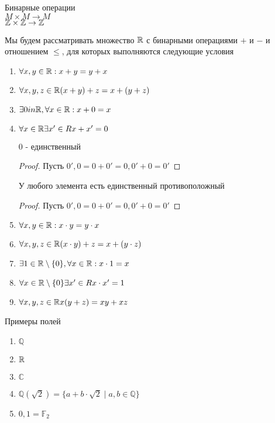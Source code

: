 

\begin{definition}
Бинарные операции \\
$ M \times M \rightarrow M $ \\
$ \mathbb{Z} \times \mathbb{Z} \rightarrow \mathbb{Z} $ 
\end{definition}

Мы будем рассматривать множество $\mathbb{R}$ с бинарными операциями $+$ и $-$ и отношением $\leq$, для которых выполняются следующие условия
\begin{enumerate}
	\item $ \forall x, y \in \mathbb{R} : x + y = y + x $ 
	\item $ \forall x, y, z \in \mathbb{R} (x + y) + z = x + (y + z) $ 
	\item $ \exists 0 in \mathbb{R}, \forall x \in \mathbb{R}: x+0 = x $ 
	\item $ \forall x \in \mathbb{R} \exists x' \in R x + x' = 0 $ 
	\begin{lemma}
		0 - единственный 
		\begin{proof}
			Пусть $0' , 0 = 0 + 0' = 0, 0' + 0 = 0'$
		\end{proof} 
	\end{lemma}
	\begin{lemma}
	У любого элемента есть единственный противоположный
	\begin{proof}
		Пусть $0' , 0 = 0 + 0' = 0, 0' + 0 = 0'$
	\end{proof} 
\end{lemma}
	\item $ \forall x, y \in \mathbb{R} : x \cdot y = y \cdot x $ 
    \item $ \forall x, y, z \in \mathbb{R} (x \cdot y) + z = x + (y \cdot z) $ 
	\item $ \exists 1 \in \mathbb{R} \setminus \{0\}, \forall x \in \mathbb{R}: x \cdot 1 = x $ 
	\item  $ \forall x \in \mathbb{R} \setminus \{0\} \exists x' \in R x \cdot x' = 1 $
	\item $ \forall x, y, z \in \mathbb{R} x(y+z) = xy + xz $ 
\end{enumerate}

\begin{example}
	Примеры полей
	\begin{enumerate}
		\item $\mathbb{Q}$ 
		\item  $\mathbb{R}$ 
		\item  $\mathbb{C}$ 
		\item  $\mathbb{Q}(\sqrt{2}) = \{a + b \cdot \sqrt{2} \mid a, b \in \mathbb{Q} \}$ 
		\item  $ {0, 1} = \mathbb{F}_2 $ 
	\end{enumerate}

\end{example}

